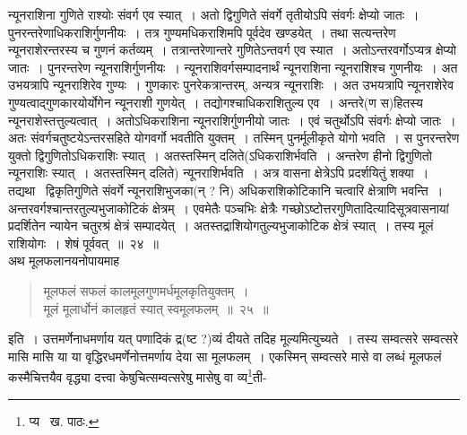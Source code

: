 \documentclass[11pt, openany]{book}
\begin{document}
\newpage

\noindent न्यूनराशिना गुणिते राश्योः संवर्ग एव स्यात्~। अतो द्विगुणिते संवर्गे तृतीयोऽपि संवर्गः क्षेप्यो जातः~। पुनरन्तरेणाधिकराशिर्गुणनीयः~। तत्र गुण्यमधिकराशिमपि पूर्वदेव खण्डयेत्~। तथा सत्यन्तरेण न्यूनराशेरन्तरस्य च गुणनं कर्तव्यम्~। तत्रान्तरेणान्तरे गुणितेऽन्तवर्ग एव स्यात~। अतोऽन्तरवर्गोऽप्यत्र क्षेप्यो जातः~। पुनरन्तरेण न्यूनराशिर्गुणनीयः~। न्यूनराशिवर्गसम्पादनार्थं न्यूनराशिना न्यूनराशिश्च गुणनीयः~। अत उभयत्रापि न्यूनराशिरेव गुण्यः~। गुणकारः पुनरेकत्रान्तरम्, अन्यत्र न्यूनराशिः~। अत उभयत्रापि न्यूनराशेरेव गुण्यत्वाद्गुणकारयोर्योगेन न्यूनराशी गुणयेत्~। तद्योगश्चाधिकराशितुल्य एव~। अन्तरे(ण स)हितस्य न्यूनराशेस्तत्तुल्यत्वात्~। अतोऽधिकराशिना न्यूनराशिर्गुणनीयो जातः~। एवं चतुर्थोऽपि संवर्गः क्षेप्यो जातः~। अतः संवर्गचतुष्टयेऽन्तरसहिते योगवर्गो भवतीति युक्तम्~। तस्मिन् पुनर्मूलीकृते योगो भवति~। स पुनरन्तरेण युक्तो द्विगुणितोऽधिकराशिः स्यात्~। अतस्तस्मिन् दलिते(ऽधिकराशिर्भवति~। अन्तरेण हीनो द्विगुणितो न्यूनराशिः स्यात्~। अतस्तस्मिन् दलिते) न्यूनराशिर्भवति~। अत्र वासना क्षेत्रेऽपि प्रदर्शयितुं शक्या~। तद्यथा \textendash\ द्विकृतिगुणिते संवर्गे न्यूनराशिभुजका(न् ? नि) अधिकराशिकोटिकानि चत्वारि क्षेत्राणि भवन्ति~। अन्तरवर्गश्चान्तरतुल्यभुजाकोटिकं क्षेत्रम्~। एवमेतैः पञ्चभिः क्षेत्रैः {\qt गच्छोऽष्टोत्तरगुणितादि}त्यादिसूत्रवासनायां प्रदर्शितेन न्यायेन चतुरश्रं क्षेत्रं सम्पादयेत्~। अतस्तद्राशियोगतुल्यभुजाकोटिक क्षेत्रं स्यात्~। तस्य मूलं राशियोगः~। शेषं पूर्ववत्~॥~२४~॥\\

अथ मूलफलानयनोपायमाह\textendash

\begin{quote}
{\ab मूलफलं सफलं कालमूलगुणमर्धमूलकृतियुक्तम्~।\\
मूलं मूलार्धोनं कालहृतं स्यात् स्वमूलफलम्~॥~२५~॥}
\end{quote}

इति~। उत्तमर्णेनाधमर्णाय यत् पणादिकं द्र(ष्ट ?)व्यं दीयते तदिह मूल्यमित्युच्यते~। तस्य सम्वत्सरे सम्वत्सरे मासि मासि या या वृद्धिरधमर्णेनोत्तमर्णाय देया सा मूलफलम्~। एकस्मिन् सम्वत्सरे मासे वा लब्धं मूलफलं कस्मैचित्तयैव वृद्ध्या दत्त्वा केषुचित्सम्वत्सरेषु मासेषु वा व्य\renewcommand{\thefootnote}{१}\footnote{प्य \textendash\ ख. पाठः.}ती-

\newpage
\end{document}
